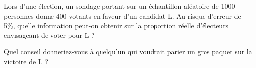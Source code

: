 
\begin{exercice}%
    \label{exosmath-0441}

Lors d'une élection, un sondage portant sur un échantillon aléatoire de 1000 personnes donne 400 votants en faveur d’un candidat L. Au risque d'erreur de 5\%, quelle information peut-on obtenir sur la proportion réelle d'électeurs envisageant de voter pour L ?

Quel conseil donneriez-vous à quelqu'un qui voudrait parier un gros paquet sur la victoire de L ?

\end{exercice}
